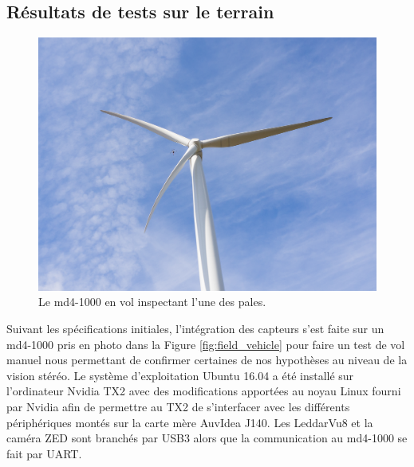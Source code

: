 \clearpage
\subsection{Résultats de tests sur le terrain}
\label{subsec:results_field}

\begin{figure}[htb]
  \centering
  \includegraphics[trim=180 200 180 180,clip,width=\linewidth]{images/test_eolienne.jpg}
  \caption{Le md4-1000 en vol inspectant l'une des pales.}
  \label{fig:test_eolienne}
\end{figure}

Suivant les spécifications initiales, l'intégration des capteurs s'est faite sur un md4-1000 pris en photo dans la Figure \ref{fig:field_vehicle} pour faire un test de vol manuel nous permettant de confirmer certaines de nos hypothèses au niveau de la vision stéréo. Le système d'exploitation Ubuntu 16.04 a été installé sur l'ordinateur Nvidia TX2 avec des modifications apportées au noyau Linux fourni par Nvidia afin de permettre au TX2 de s'interfacer avec les différents périphériques montés sur la carte mère AuvIdea J140. Les LeddarVu8 et la caméra ZED sont branchés par USB3 alors que la communication au md4-1000 se fait par UART.


